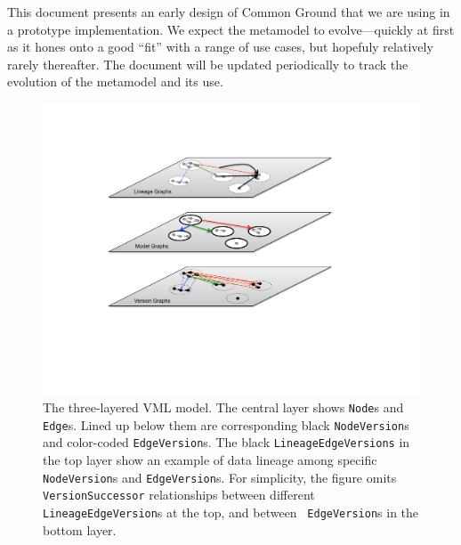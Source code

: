 \documentclass{article}
\newcommand{\vml}{VML\xspace}
\newcommand{\node}{\texttt{Node}\xspace}
\newcommand{\edge}{\texttt{Edge}\xspace}
\begin{document}
This document presents an early design of Common Ground that we are using in a prototype implementation.  We expect the metamodel to evolve---quickly at first as it hones onto a good ``fit'' with a range of use cases, but hopefuly relatively rarely thereafter.  The document will be updated periodically to track the evolution of the metamodel and its use.

\begin{figure}
\centering
\includegraphics[width=0.75\linewidth]{layers.pdf}
\caption{The three-layered \vml model.  The central layer shows {\node}s and {\edge}s.  
Lined up below them are corresponding black \texttt{NodeVersion}s and color-coded \texttt{EdgeVersion}s.  
The black \texttt{LineageEdgeVersions} in the top layer show an example of data lineage among specific \texttt{NodeVersion}s and \texttt{EdgeVersion}s.  For simplicity, the figure omits \texttt{VersionSuccessor} relationships between different \texttt{LineageEdgeVersion}s at the top, and between \
\texttt{EdgeVersion}s in the bottom layer.}
\label{fig:layers}
\end{figure}
\end{document}
